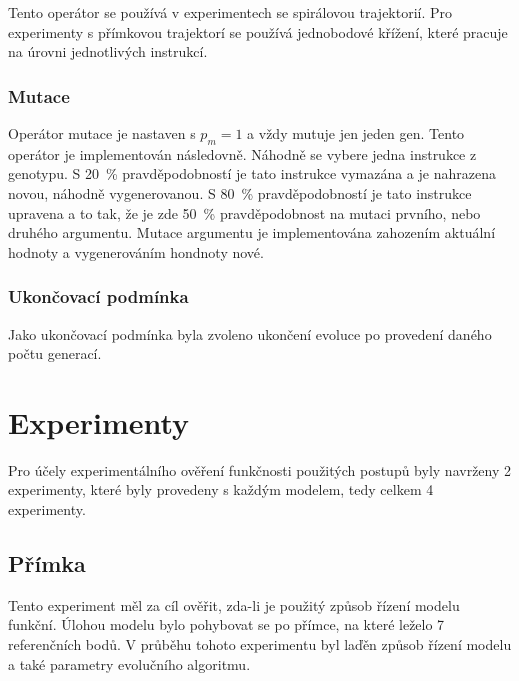 Tento operátor se používá v experimentech se spirálovou trajektorií.
Pro experimenty s přímkovou trajektorí se používá jednobodové křížení, které pracuje na úrovni jednotlivých instrukcí.

\subsection{Mutace}
Operátor mutace je nastaven s $p_m = 1$ a vždy mutuje jen jeden gen.
Tento operátor je implementován následovně.
Náhodně se vybere jedna instrukce z genotypu.
S 20~\% pravděpodobností je tato instrukce vymazána a je nahrazena novou, náhodně vygenerovanou.
S 80~\% pravděpodobností je tato instrukce upravena a to tak, že je zde 50~\% pravděpodobnost na mutaci prvního, nebo druhého argumentu.
Mutace argumentu je implementována zahozením aktuální hodnoty a vygenerováním hondnoty nové.


\subsection{Ukončovací podmínka}
Jako ukončovací podmínka byla zvoleno ukončení evoluce po provedení daného počtu generací.



\chapter{Experimenty}
\label{chap:experimenty}
Pro účely experimentálního ověření funkčnosti použitých postupů byly navrženy 2 experimenty, které byly provedeny s každým modelem, tedy celkem 4 experimenty.

\section{Přímka}
Tento experiment měl za cíl ověřit, zda-li je použitý způsob řízení modelu funkční.
Úlohou modelu bylo pohybovat se po přímce, na které leželo 7 referenčních bodů.
V průběhu tohoto experimentu byl laďěn způsob řízení modelu a také parametry evolučního algoritmu.

